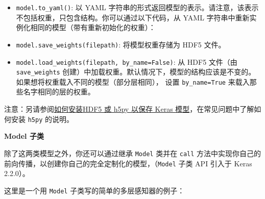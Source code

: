 \begin{Shaded}
\begin{Highlighting}[]
  

\OperatorTok{=} 
\OperatorTok{=} 
\end{Highlighting}
\end{Shaded}

\begin{itemize}
\tightlist
\item
  \texttt{model.to\_yaml()}: 以 YAML
  字符串的形式返回模型的表示。请注意，该表示不包括权重，只包含结构。你可以通过以下代码，从
  YAML 字符串中重新实例化相同的模型（带有重新初始化的权重）：
\end{itemize}

\begin{Shaded}
\begin{Highlighting}[]
  

\OperatorTok{=} 
\OperatorTok{=} 
\end{Highlighting}
\end{Shaded}

\begin{itemize}
\tightlist
\item
  \texttt{model.save\_weights(filepath)}: 将模型权重存储为 HDF5 文件。
\item
  \texttt{model.load\_weights(filepath,\ by\_name=False)}: 从 HDF5
  文件（由 \texttt{save\_weights}
  创建）中加载权重。默认情况下，模型的结构应该是不变的。
  如果想将权重载入不同的模型（部分层相同）， 设置 \texttt{by\_name=True}
  来载入那些名字相同的层的权重。
\end{itemize}

注意：另请参阅\hyperref[how-can-i-install-HDF5-or-h5py-to-save-my-models-in-Keras]{如何安装HDF5 或 h5py 以保存 Keras 模型}，在常见问题中了解如何安装 \texttt{h5py}
的说明。


\textbf{Model 子类}

除了这两类模型之外，你还可以通过继承 \texttt{Model} 类并在 \texttt{call}
方法中实现你自己的前向传播，以创建你自己的完全定制化的模型，（\texttt{Model} 子类 API 引入于 Keras 2.2.0）。

这里是一个用 \texttt{Model} 子类写的简单的多层感知器的例子：

